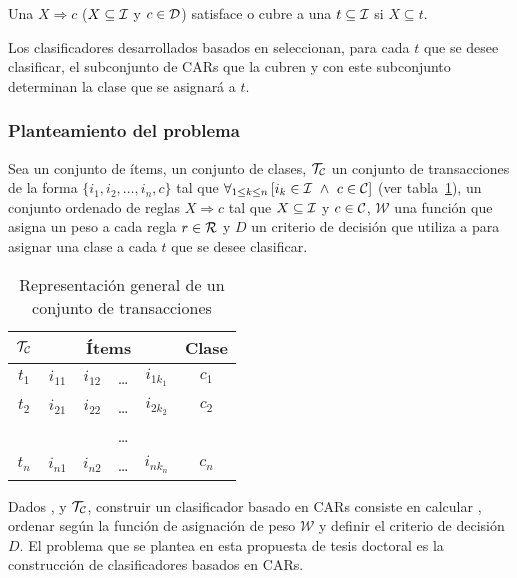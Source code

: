 \begin{Definition}
  Una \CAR $X\Rightarrow c$ ($X\subseteq\I$ y $c\in\D$) satisface o cubre a una \transaccion $t\subseteq\I$ si $X\subseteq t$.
\label{def:cubrimiento-CAR}
\end{Definition}

Los clasificadores desarrollados basados en \CARs seleccionan, para cada \transaccion $t$ que se desee clasificar, el subconjunto de CARs que la cubren y con este subconjunto determinan la clase que se asignará a $t$.

\subsubsection{Planteamiento del problema}
\label{sec:CAR-planteamiento-del-problema}
Sea \I un conjunto de ítems, \C un conjunto de clases, $\T_\C$ un conjunto de transacciones de la forma $\{i_1,i_2,\ldots,i_n,c\}$ tal que $\forall_{1\leq k\leq n}\left[i_k\in\I\ \wedge\ c\in\C\right]$ (ver tabla~\ref{tabla:HLeon}), \R un conjunto ordenado de reglas $X\Rightarrow c$ tal que $X\subseteq\I$ y $c\in\C$, $\mathcal{W}$ una función que asigna un peso a cada regla $r\in\R$ y $D$ un criterio de decisión que utiliza a \R para asignar una clase a cada \transaccion $t$ que se desee clasificar.

\begin{table}[htp]
\caption{Representación general de un conjunto de transacciones}
\begin{center}
\begin{tabular}{c|ccccc}
$\T_\C$  &  \multicolumn{4}{c}{Ítems}                               &   Clase \\\hline
$t_1$      & $i_{11}$   & $i_{12}$   & \ldots  & $i_{1k_1}$  & $c_1$ \\
$t_2$      & $i_{21}$   & $i_{22}$  & \ldots  & $i_{2k_2}$  & $c_2$ \\
               &                 &                 & \ldots  &                    &  \\
$t_n$     & $i_{n1}$   & $i_{n2}$   & \ldots  & $i_{nk_n}$  & $c_n$ 
\end{tabular}
\end{center}
\label{tabla:HLeon}
\end{table}%

Dados \I, \C y $\T_\C$, construir un clasificador basado en CARs consiste en calcular \R, ordenar \R según la función de asignación de peso $\mathcal{W}$ y definir el criterio de decisión $D$. El problema que se plantea en esta propuesta de tesis doctoral es la construcción de clasificadores basados en CARs.

